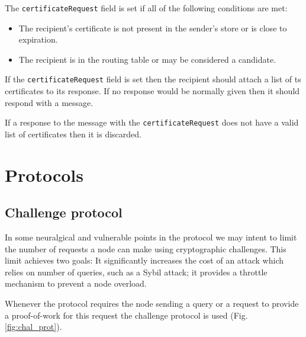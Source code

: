 The \texttt{certificateRequest} field is set if all of the following conditions
are met:

\begin{itemize}
  \item The recipient's certificate is not present in the sender's store or is
    close to expiration.
  \item The recipient is in the routing table or may be considered a candidate.
\end{itemize}

If the \texttt{certificateRequest} field is set then the recipient should attach
a list of ts certificates to its response. If no response would be normally
given then it should respond with a  message.

If a response to the message with the \texttt{certificateRequest} does not have
a valid list of certificates then it is discarded.

\section{Protocols}
\label{sec:ghoul_protocols}
\subsection{Challenge protocol}
In some neuralgical and vulnerable points in the protocol we may intent to limit
the number of requests a node can make using cryptographic challenges. This
limit achieves two goals: It significantly increases the cost of an attack which
relies on number of queries, such as a Sybil attack; it provides a throttle
mechanism to prevent a node overload.

Whenever the protocol requires the node sending a query or a request to provide
a proof-of-work for this request the challenge protocol is used
(Fig. \ref{fig:chal_prot}).

